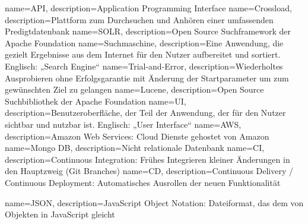 {
    name={API},
    description={Application Programming Interface}
}
{
    name={Crossload},
    description={Plattform zum Durchsuchen und Anhören einer umfassenden Predigtdatenbank}
}
{
    name={SOLR},
    description={Open Source Suchframework der Apache Foundation}
}
{
    name={Suchmaschine},
    description={Eine Anwendung, die gezielt Ergebnisse aus dem Internet für den Nutzer aufbereitet und sortiert. Englisch: „Search Engine“}
}
{
    name={Trial-and-Error},
    description={Wiederholtes Ausprobieren ohne Erfolgsgarantie mit Änderung der Startparameter um zum gewünschten Ziel zu gelangen}
}
{
    name={Lucene},
    description={Open Source Suchbibliothek der Apache Foundation}
}
{
    name={UI},
    description={Benutzeroberfläche, der Teil der Anwendung, der für den Nutzer sichtbar und nutzbar ist. Englisch: „User Interface“}
}
{
    name={AWS},
    description={Amazon Web Services: Cloud Dienste gehostet von Amazon}
}
{
    name={Mongo DB},
    description={Nicht relationale Datenbank}
}
{
    name={CI},
    description={Continuous Integration: Frühes Integrieren kleiner Änderungen in den Hauptzweig (Git Branches)}
}
{
    name={CD},
    description={Continuous Delivery / Continuous Deployment: Automatisches Ausrollen der neuen Funktionalität}
}

{
    name={JSON},
    description={JavaScript Object Notation: Dateiformat, das dem von Objekten in JavaScript gleicht}
}


\glsaddall
